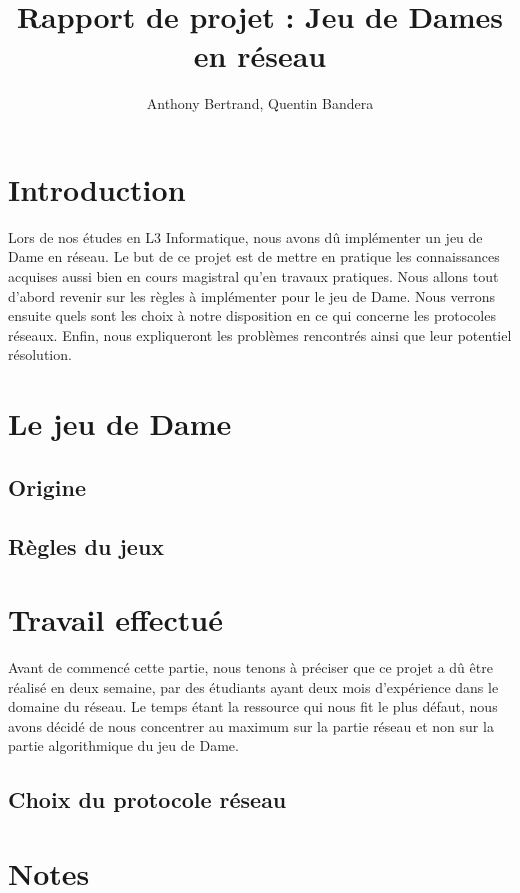 \documentclass{article}
\title{Rapport de projet : Jeu de Dames en réseau}
\author{Anthony Bertrand, Quentin Bandera}
\date{}
\begin{document}
    \maketitle
    \tableofcontents
    \newpage
    \section{Introduction}
        Lors de nos études en L3 Informatique, nous avons dû implémenter un jeu de Dame en réseau. Le but de ce projet
        est de mettre en pratique les connaissances acquises aussi bien en cours magistral qu'en travaux pratiques.
        Nous allons tout d'abord revenir sur les règles à implémenter pour le jeu de Dame. Nous verrons ensuite quels sont
        les choix à notre disposition en ce qui concerne les protocoles réseaux. Enfin, nous expliqueront les problèmes
        rencontrés ainsi que leur potentiel résolution.

    \section{Le jeu de Dame}
    \subsection{Origine}
    \subsection{Règles du jeux}

    \section{Travail effectué}
        Avant de commencé cette partie, nous tenons à préciser que ce projet a dû être réalisé en deux semaine, par des étudiants
        ayant deux mois d'expérience dans le domaine du réseau. Le temps étant la ressource qui nous fit le plus défaut, nous avons
        décidé de nous concentrer au maximum sur la partie réseau et non sur la partie algorithmique du jeu de Dame.
    \subsection{Choix du protocole réseau}
    \section{Notes}
\end{document}
